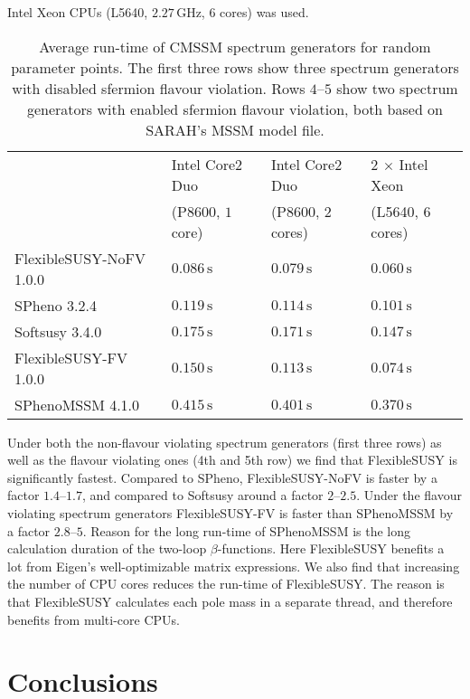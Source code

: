\documentclass[final,3p,11pt,pdflatex]{elsarticle}
\makeatletter
\newcommand{\fs}{FlexibleSUSY\@\xspace}
\newcommand{\unit}[1]{\,\text{#1}}      %
\makeatother
\begin{document}
Intel Xeon CPUs (L5640, $2.27\unit{GHz}$, $6$ cores) was used.
%
\begin{table}[tbh]
  \centering
  \begin{tabular}{llll}
    \toprule
                            & Intel Core2 Duo    & Intel Core2 Duo   & $2$ $\times$ Intel Xeon\\
                            & (P8600, $1$ core)  & (P8600, $2$ cores)& (L5640, $6$ cores)\\
    \midrule
    FlexibleSUSY-NoFV 1.0.0 & $0.086\unit{s}$    & $0.079\unit{s}$   & $0.060\unit{s}$\\
    SPheno 3.2.4            & $0.119\unit{s}$    & $0.114\unit{s}$   & $0.101\unit{s}$\\
    Softsusy 3.4.0          & $0.175\unit{s}$    & $0.171\unit{s}$   & $0.147\unit{s}$\\
    \midrule
    FlexibleSUSY-FV 1.0.0   & $0.150\unit{s}$    & $0.113\unit{s}$   & $0.074\unit{s}$\\
    SPhenoMSSM 4.1.0        & $0.415\unit{s}$    & $0.401\unit{s}$   & $0.370\unit{s}$\\
    \bottomrule
  \end{tabular}
  \caption{Average run-time of CMSSM spectrum generators
    for random parameter points.  The first three rows show three
    spectrum generators with disabled sfermion flavour violation.  Rows
    $4$--$5$ show two spectrum generators with enabled sfermion flavour violation, both based
    on SARAH's MSSM model file.}
  \label{tab:run-time-comparison}
\end{table}

Under both the non-flavour violating spectrum generators (first three
rows) as well as the flavour violating ones (4th and 5th row) we find
that \fs is significantly fastest.  Compared to SPheno,
FlexibleSUSY-NoFV is faster by a factor $1.4$--$1.7$, and compared to
Softsusy around a factor $2$--$2.5$.  Under the flavour violating
spectrum generators FlexibleSUSY-FV is faster than SPhenoMSSM by a
factor $2.8$--$5$.  Reason for the long run-time of SPhenoMSSM is the
long calculation duration of the two-loop $\beta$-functions.  Here \fs
benefits a lot from Eigen's well-optimizable matrix expressions.  We
also find that increasing the number of CPU cores reduces the run-time
of \fs.  The reason is that \fs calculates each pole mass in a
separate thread, and therefore benefits from multi-core CPUs.

\section{Conclusions}
\end{document}
